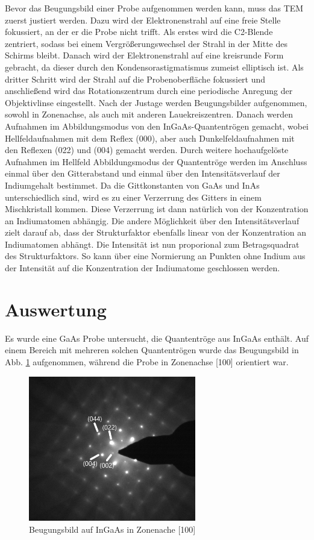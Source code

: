 \documentclass[a4paper,11pt,DIV=11]{scrartcl}
\begin{document}
Bevor das Beugungsbild einer Probe aufgenommen werden kann, muss das TEM zuerst justiert werden. Dazu wird der Elektronenstrahl auf eine freie Stelle fokussiert, an der er die Probe nicht trifft. Als erstes wird die C2-Blende zentriert, sodass bei einem Vergrößerungswechsel der Strahl in der Mitte des Schirms bleibt. Danach wird der Elektronenstrahl auf eine kreisrunde Form gebracht, da dieser durch den Kondensorastigmatismus zumeist elliptisch ist. Als dritter Schritt wird der Strahl auf die Probenoberfläche fokussiert und anschließend wird das Rotationszentrum durch eine periodische Anregung der Objektivlinse eingestellt. Nach der Justage werden Beugungsbilder aufgenommen, sowohl in Zonenachse, als auch mit anderen Lauekreiszentren. Danach werden Aufnahmen im Abbildungsmodus von den InGaAs-Quantentrögen gemacht, wobei Hellfeldaufnahmen mit dem Reflex (000), aber auch Dunkelfeldaufnahmen mit den Reflexen (022) und (004) gemacht werden. Durch weitere hochaufgelöste Aufnahmen im Hellfeld Abbildungsmodus der Quantentröge werden im Anschluss einmal über den Gitterabstand und einmal über den Intensitätsverlauf der Indiumgehalt bestimmet. Da die Gittkonstanten von GaAs und InAs unterschiedlich sind, wird es zu einer Verzerrung des Gitters in einem Mischkristall kommen. Diese Verzerrung ist dann natürlich von der Konzentration an Indiumatomen abhängig. Die andere Möglichkeit über den Intensitätsverlauf zielt darauf ab, dass der Strukturfaktor ebenfalls linear von der Konzentration an Indiumatomen abhängt. Die Intensität ist nun proporional zum Betragsquadrat des Strukturfaktors. So kann über eine Normierung an Punkten ohne Indium aus der Intensität auf die Konzentration der Indiumatome geschlossen werden.

\section{Auswertung}

Es wurde eine GaAs Probe untersucht, die Quantentröge aus InGaAs enthält. Auf einem Bereich mit mehreren solchen Quantentrögen wurde das Beugungsbild in Abb. \ref{100ind} aufgenommen, während die Probe in Zonenachse [100] orientiert war.

\begin{figure}[h]\centering
	\includegraphics[width=0.65\textwidth]{Versuchsdaten/8/indiziert2.png}
\caption{Beugungsbild auf InGaAs in Zonenache [100]}
\label{100ind}
\end{figure}
\end{document}
